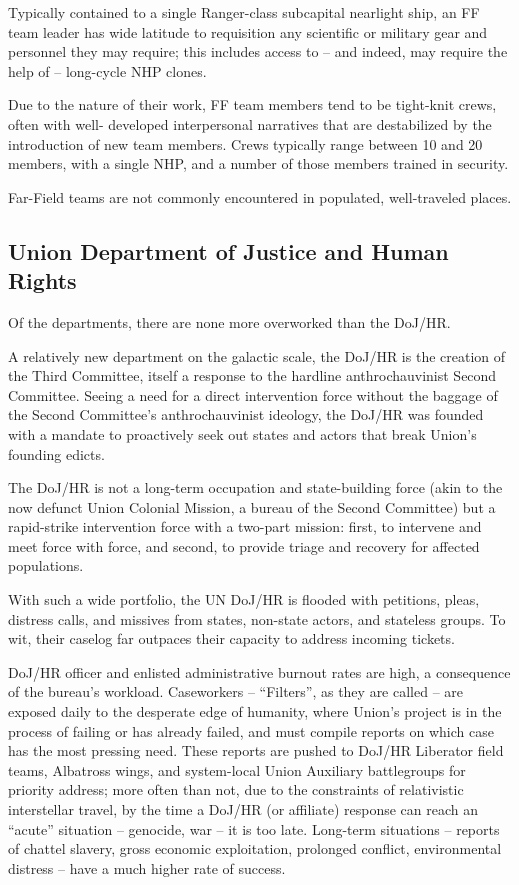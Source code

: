 Typically contained to a single Ranger-class subcapital nearlight ship, an FF team leader has
wide latitude to requisition any scientific or military gear and personnel they may require; this
includes access to -- and indeed, may require the help of -- long-cycle NHP clones.

Due to the nature of their work, FF team members tend to be tight-knit crews, often with well-
developed interpersonal narratives that are destabilized by the introduction of new team
members. Crews typically range between 10 and 20 members, with a single NHP, and a number
of those members trained in security.

Far-Field teams are not commonly encountered in populated, well-traveled places.

\subsection{Union Department of Justice and Human Rights}

Of the departments, there are none more overworked than the DoJ/HR.

A relatively new department on the galactic scale, the DoJ/HR is the creation of the Third
Committee, itself a response to the hardline anthrochauvinist Second Committee. Seeing a need
for a direct intervention force without the baggage of the Second Committee’s anthrochauvinist
ideology, the DoJ/HR was founded with a mandate to proactively seek out states and actors that
break Union’s founding edicts.

The DoJ/HR is not a long-term occupation and state-building force (akin to the now defunct Union
Colonial Mission, a bureau of the Second Committee) but a rapid-strike intervention force with a
two-part mission: first, to intervene and meet force with force, and second, to provide triage and
recovery for affected populations.

With such a wide portfolio, the UN DoJ/HR is flooded with petitions, pleas, distress calls, and
missives from states, non-state actors, and stateless groups. To wit, their caselog far outpaces
their capacity to address incoming tickets.

DoJ/HR officer and enlisted administrative burnout rates are high, a consequence of the bureau’s
workload. Caseworkers -- “Filters”, as they are called -- are exposed daily to the desperate edge
of humanity, where Union’s project is in the process of failing or has already failed, and must
compile reports on which case has the most pressing need. These reports are pushed to DoJ/HR
Liberator field teams, Albatross wings, and system-local Union Auxiliary battlegroups for priority
address; more often than not, due to the constraints of relativistic interstellar travel, by the time a
DoJ/HR (or affiliate) response can reach an “acute” situation -- genocide, war -- it is too late.
Long-term situations -- reports of chattel slavery, gross economic exploitation, prolonged conflict,
environmental distress -- have a much higher rate of success.

